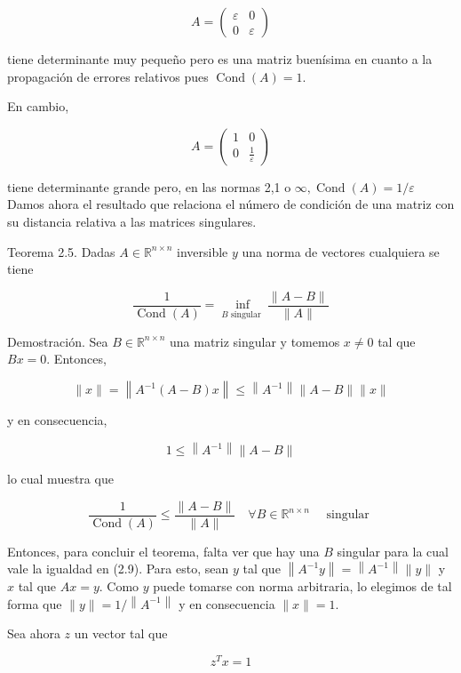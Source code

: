\documentclass[10pt]{article}
\begin{document}
$$
A=\left(\begin{array}{ll}
\varepsilon & 0 \\
0 & \varepsilon
\end{array}\right)
$$

tiene determinante muy pequeño pero es una matriz buenísima en cuanto a la propagación de errores relativos pues $\operatorname{Cond}(A)=1$.

En cambio,

$$
A=\left(\begin{array}{cc}
1 & 0 \\
0 & \frac{1}{\varepsilon}
\end{array}\right)
$$

tiene determinante grande pero, en las normas 2,1 o $\infty, \operatorname{Cond}(A)=1 / \varepsilon$\\
Damos ahora el resultado que relaciona el número de condición de una matriz con su distancia relativa a las matrices singulares.

Teorema 2.5. Dadas $A \in \mathbb{R}^{n \times n}$ inversible $y$ una norma de vectores cualquiera se tiene

$$
\frac{1}{\operatorname{Cond}(A)}=\inf _{B \text { singular }} \frac{\|A-B\|}{\|A\|}
$$

Demostración. Sea $B \in \mathbb{R}^{n \times n}$ una matriz singular y tomemos $x \neq 0$ tal que $B x=0$. Entonces,

$$
\|x\|=\left\|A^{-1}(A-B) x\right\| \leq\left\|A^{-1}\right\|\|A-B\|\|x\|
$$

y en consecuencia,

$$
1 \leq\left\|A^{-1}\right\|\|A-B\|
$$

lo cual muestra que


\begin{equation*}
\frac{1}{\operatorname{Cond}(A)} \leq \frac{\|A-B\|}{\|A\|} \quad \forall B \in \mathbb{R}^{n \times n} \quad \text { singular } \tag{2.9}
\end{equation*}


Entonces, para concluir el teorema, falta ver que hay una $B$ singular para la cual vale la igualdad en (2.9). Para esto, sean $y$ tal que $\left\|A^{-1} y\right\|=\left\|A^{-1}\right\|\|y\|$ y $x$ tal que $A x=y$. Como $y$ puede tomarse con norma arbitraria, lo elegimos de tal forma que $\|y\|=1 /\left\|A^{-1}\right\|$ y en consecuencia $\|x\|=1$.

Sea ahora $z$ un vector tal que


\begin{equation*}
z^{T} x=1 \tag{2.10}
\end{equation*}
\end{document}
